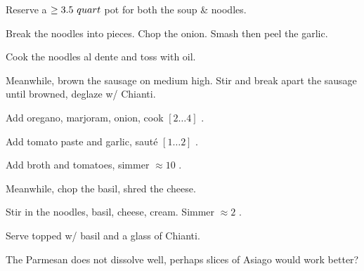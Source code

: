 \begin{preparation}
\item Reserve a $\geq 3.5~quart$ pot for both the soup \& noodles.

\item Break the noodles into pieces.
	Chop the onion.
	Smash then peel the garlic.

\item Cook the noodles al dente and toss with oil.

\item Meanwhile, brown the sausage on medium high.
	Stir and break apart the sausage until browned, deglaze w/ Chianti.

\item Add oregano, marjoram, onion, cook $[2 \ldots 4]$ \minute.

\item Add tomato paste and garlic, saut\'{e} $[1 \ldots 2]$ \minute.

\item Add broth and tomatoes, simmer $\approx 10$ \minute.

\item Meanwhile, chop the basil, shred the cheese.

\item Stir in the noodles, basil, cheese, cream.
	Simmer $\approx 2$ \minute.

\item Serve topped w/ basil and a glass of Chianti.
\end{preparation}


\begin{experiments}
\item The Parmesan does not dissolve well, perhaps slices of Asiago would work better?
\end{experiments}


\recipeend%
